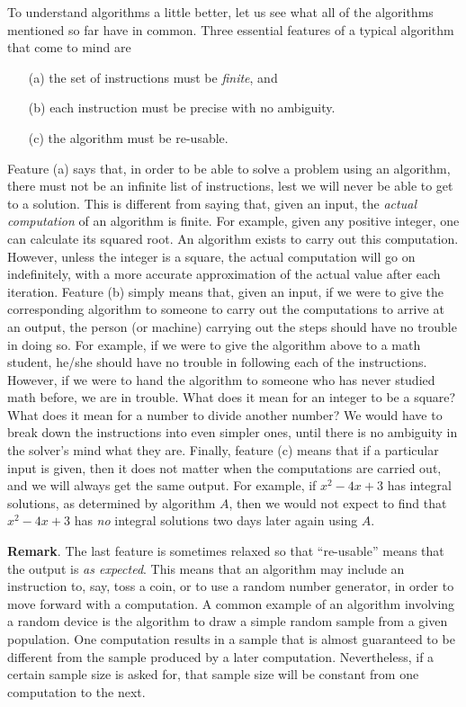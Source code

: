 \documentclass[12pt]{article}
\begin{document}
To understand algorithms a little better, let us see what all of the algorithms mentioned so far have in common.  Three essential features of a typical algorithm that come to mind are
\begin{itemize}
\item[(a)] the set of instructions must be \emph{finite}, and
\item[(b)] each instruction must be precise with no ambiguity.
\item[(c)] the algorithm must be re-usable.
\end{itemize}
Feature (a) says that, in order to be able to solve a problem using an algorithm, there must not be an infinite list of instructions, lest we will never be able to get to a solution.  This is different from saying that, given an input, the \emph{actual computation} of an algorithm is finite.  For example, given any positive integer, one can calculate its squared root.  An algorithm exists to carry out this computation.  However, unless the integer is a square, the actual computation will go on indefinitely, with a more accurate approximation of the actual value after each iteration.  Feature (b) simply means that, given an input, if we were to give the corresponding algorithm to someone to carry out the computations to arrive at an output, the person (or machine) carrying out the steps should have no trouble in doing so.  For example, if we were to give the algorithm above to a math student, he/she should have no trouble in following each of the instructions.  However, if we were to hand the algorithm to someone who has never studied math before, we are in trouble.  What does it mean for an integer to be a square?  What does it mean for a number to divide another number?  We would have to break down the instructions into even simpler ones, until there is no ambiguity in the solver's mind what they are.  Finally, feature (c) means that if a particular input is given, then it does not matter when the computations are carried out, and we will always get the same output.  For example, if $x^2-4x+3$ has integral solutions, as determined by algorithm $A$, then we would not expect to find that $x^2-4x+3$ has \emph{no} integral solutions two days later again using $A$.

\textbf{Remark}.  The last feature is sometimes relaxed so that ``re-usable'' means that the output is \emph{as expected}.  This means that an algorithm may include an instruction to, say, toss a coin, or to use a random number generator, in order to move forward with a computation.  A common example of an algorithm involving a random device is the algorithm to draw a simple random sample from a given population.  One computation results in a sample that is almost guaranteed to be different from the sample produced by a later computation.  Nevertheless, if a certain sample size is asked for, that sample size will be constant from one computation to the next.
\end{document}
